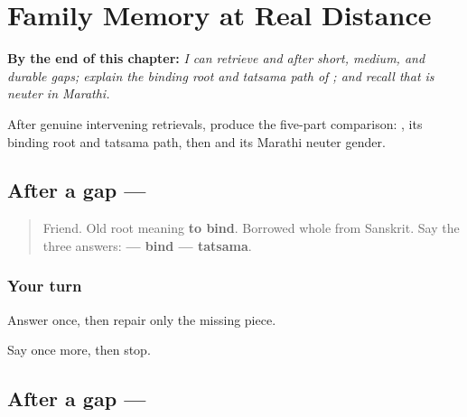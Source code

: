 
\chapter{Family Memory at Real Distance}
\label{ch:mr-family-memory}

\begin{chapteropening}
\textbf{By the end of this chapter:} \emph{I can retrieve  and  after short, medium, and durable gaps; explain the binding root and tatsama path of ; and recall that  is neuter in Marathi.}

After genuine intervening retrievals, produce the five-part comparison: , its binding root and tatsama path, then  and its Marathi neuter gender.
\end{chapteropening}

\section[\texorpdfstring{\mr{मित्र} (mitra)}{मित्र (mitra)}]{After a gap — }

\label{lesson:MR-R14-mitra-r2}



\begin{quote}
Friend. Old root meaning \textbf{to bind}. Borrowed whole from Sanskrit. Say the three answers: \textbf{ — bind — tatsama}.
\end{quote}

\subsection*{Your turn}
Answer once, then repair only the missing piece.

\begin{tcolorbox}[breakable,colback=teal!4,colframe=teal!35!black,title={Before you move on}]
Say \textbf{} once more, then stop.
\end{tcolorbox}
\section[\texorpdfstring{\mr{कुटुंब} (kutumb)}{कुटुंब (kutumb)}]{After a gap — }

